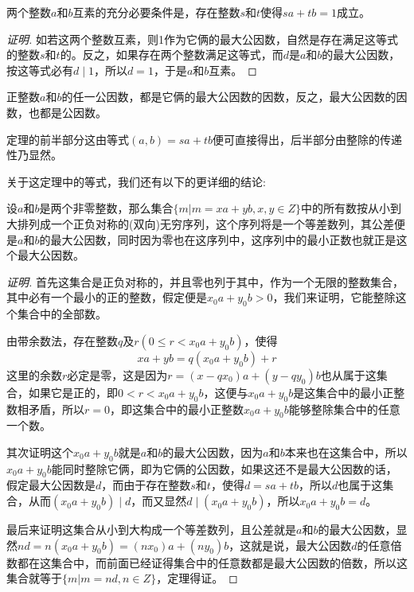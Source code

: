 \begin{inference}
  两个整数$a$和$b$互素的充分必要条件是，存在整数$s$和$t$使得$sa+tb=1$成立。
\end{inference}

\begin{proof}[证明]
  如若这两个整数互素，则1作为它俩的最大公因数，自然是存在满足这等式的整数$s$和$t$的。反之，如果存在两个整数满足这等式，而$d$是$a$和$b$的最大公因数，按这等式必有$d \mid 1$，所以$d=1$，于是$a$和$b$互素。
\end{proof}

\begin{inference}
  正整数$a$和$b$的任一公因数，都是它俩的最大公因数的因数，反之，最大公因数的因数，也都是公因数。
\end{inference}

定理的前半部分这由等式$(a,b)=sa+tb$便可直接得出，后半部分由整除的传递性乃显然。


关于这定理中的等式，我们还有以下的更详细的结论:
\begin{theorem}
  设$a$和$b$是两个非零整数，那么集合$\{m|m=xa+yb, x,y \in Z \}$中的所有数按从小到大排列成一个正负对称的(双向)无穷序列，这个序列将是一个等差数列，其公差便是$a$和$b$的最大公因数，同时因为零也在这序列中，这序列中的最小正数也就正是这个最大公因数。
\end{theorem}

\begin{proof}[证明]
  首先这集合是正负对称的，并且零也列于其中，作为一个无限的整数集合，其中必有一个最小的正的整数，假定便是$x_0a+y_0b>0$，我们来证明，它能整除这个集合中的全部数。

  由带余数法，存在整数$q$及$r(0 \leqslant r < x_0a+y_0b)$，使得
  \[ xa+yb = q(x_0a+y_0b) + r \]
  这里的余数$r$必定是零，这是因为$r=(x-qx_0)a+(y-qy_0)b$也从属于这集合，如果它是正的，即$0 < r < x_0a+y_0b$，这便与$x_0a+y_0b$是这集合中的最小正整数相矛盾，所以$r=0$，即这集合中的最小正整数$x_0a+y_0b$能够整除集合中的任意一个数。

  其次证明这个$x_0a+y_0b$就是$a$和$b$的最大公因数，因为$a$和$b$本来也在这集合中，所以$x_0a+y_0b$能同时整除它俩，即为它俩的公因数，如果这还不是最大公因数的话，假定最大公因数是$d$，而由于存在整数$s$和$t$，使得$d=sa+tb$，所以$d$也属于这集合，从而$(x_0a+y_0b) \mid d$，而又显然$d \mid (x_0a+y_0b)$，所以$x_0a+y_0b=d$。

  最后来证明这集合从小到大构成一个等差数列，且公差就是$a$和$b$的最大公因数，显然$nd=n(x_0a+y_0b)=(nx_0)a+(ny_0)b$，这就是说，最大公因数$d$的任意倍数都在这集合中，而前面已经证得集合中的任意数都是最大公因数的倍数，所以这集合就等于$\{m | m=nd, n\in Z \}$，定理得证。
\end{proof}

